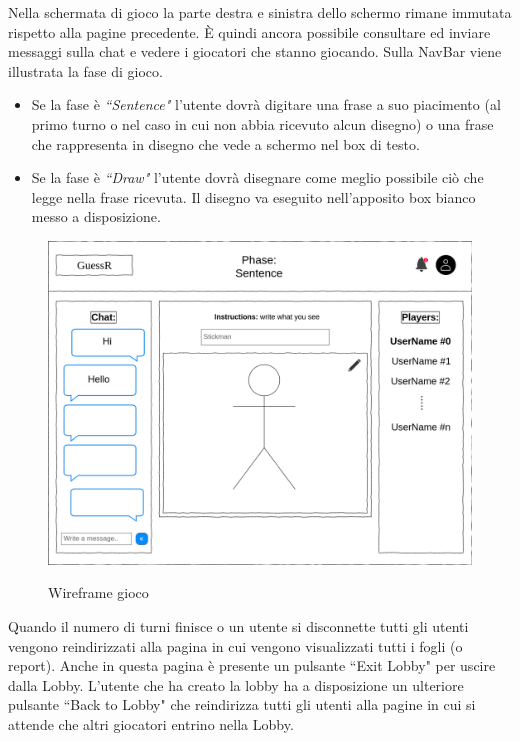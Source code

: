 \noindent Nella schermata di gioco la parte destra e sinistra dello schermo rimane immutata rispetto alla pagine precedente. È quindi ancora possibile consultare ed inviare messaggi sulla chat e vedere i giocatori che stanno giocando.\newline
Sulla NavBar viene illustrata la fase di gioco.
\begin{itemize}
    \item Se la fase è \textit{``Sentence"} l'utente dovrà digitare una frase a suo piacimento (al primo turno o nel caso in cui non abbia ricevuto alcun disegno) o una frase che rappresenta in disegno che vede a schermo nel box di testo.
    \item Se la fase è \textit{``Draw"} l'utente dovrà disegnare come meglio possibile ciò che legge nella frase ricevuta.
    Il disegno va eseguito nell'apposito box bianco messo a disposizione.
\end{itemize}

\begin{figure}[H]
    \caption{Wireframe gioco}
    \centering
    \includegraphics[width=\linewidth]{img/wireframes/in_game.png}
    \label{fig:wireframe_in_game_desktop}
\end{figure}

\noindent Quando il numero di turni finisce o un utente si disconnette tutti gli utenti vengono reindirizzati alla pagina in cui vengono visualizzati tutti i fogli (o report). Anche in questa pagina è presente un pulsante ``Exit Lobby" per uscire dalla Lobby. L'utente che ha creato la lobby ha a disposizione un ulteriore pulsante ``Back to Lobby" che reindirizza tutti gli utenti alla pagine in cui si attende che altri giocatori entrino nella Lobby. 

